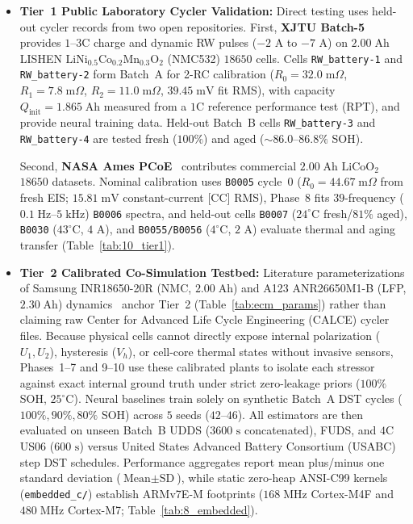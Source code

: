 \documentclass[10pt,a4paper]{article}
\begin{document}
\begin{itemize}
\item \textbf{Tier~1 Public Laboratory Cycler Validation:} Direct testing uses held-out cycler records from two open repositories. First, \textbf{XJTU Batch-5}~\cite{Wang2024xjtu} provides $1\text{--}3\text{C}$ charge and dynamic RW pulses ($-2\text{ A}$ to $-7\text{ A}$) on $2.00\;\mathrm{Ah}$ LISHEN $\text{LiNi}_{0.5}\text{Co}_{0.2}\text{Mn}_{0.3}\text{O}_2$ (NMC532) $18650$ cells. Cells \texttt{RW\_battery-1} and \texttt{RW\_battery-2} form Batch~A for 2-RC calibration ($R_0 = 32.0\;\mathrm{m}\Omega$, $R_1 = 7.8\;\mathrm{m}\Omega$, $R_2 = 11.0\;\mathrm{m}\Omega$, $39.45\;\mathrm{mV}$ fit RMS), with capacity $Q_{\text{init}} = 1.865\;\mathrm{Ah}$ measured from a $1\text{C}$ reference performance test (RPT), and provide neural training data. Held-out Batch~B cells \texttt{RW\_battery-3} and \texttt{RW\_battery-4} are tested fresh ($100\%$) and aged ($\sim 86.0\text{--}86.8\%$ SOH).

Second, \textbf{NASA Ames PCoE}~\cite{Saha2007nasa} contributes commercial $2.00\;\mathrm{Ah}$ $\text{LiCoO}_2$ $18650$ datasets. Nominal calibration uses \texttt{B0005} cycle~0 ($R_0 = 44.67\;\mathrm{m}\Omega$ from fresh EIS; $15.81\;\mathrm{mV}$ constant-current [CC] RMS), Phase~8 fits $39$-frequency ($0.1\;\mathrm{Hz}\text{--}5\;\mathrm{kHz}$) \texttt{B0006} spectra, and held-out cells \texttt{B0007} ($24^\circ\text{C}$ fresh/$81\%$ aged), \texttt{B0030} ($43^\circ\text{C}$, $4\text{ A}$), and \texttt{B0055/B0056} ($4^\circ\text{C}$, $2\text{ A}$) evaluate thermal and aging transfer (Table~\ref{tab:10_tier1}).
\item \textbf{Tier~2 Calibrated Co-Simulation Testbed:} Literature parameterizations of Samsung INR18650-20R (NMC, $2.00\;\mathrm{Ah}$) and A123 ANR26650M1-B (LFP, $2.30\;\mathrm{Ah}$) dynamics~\cite{He2011ecm,Hu2012ecm,Birkl2017diagnostics,Pecht2011calce} anchor Tier~2 (Table~\ref{tab:ecm_params}) rather than claiming raw Center for Advanced Life Cycle Engineering (CALCE) cycler files. Because physical cells cannot directly expose internal polarization ($U_1, U_2$), hysteresis ($V_h$), or cell-core thermal states without invasive sensors, Phases~1--7 and 9--10 use these calibrated plants to isolate each stressor against exact internal ground truth under strict zero-leakage priors ($100\%$ SOH, $25^\circ\text{C}$). Neural baselines train solely on synthetic Batch~A DST cycles ($100\%, 90\%, 80\%$ SOH) across $5$ seeds ($42\text{--}46$). All estimators are then evaluated on unseen Batch~B UDDS ($3600\text{ s}$ concatenated), FUDS, and $4\text{C}$ US06 ($600\text{ s}$) versus United States Advanced Battery Consortium (USABC) step DST schedules. Performance aggregates report mean plus/minus one standard deviation ($\text{Mean}\pm\text{SD}$), while static zero-heap ANSI-C99 kernels (\texttt{embedded\_c/}) establish ARMv7E-M footprints ($168\;\mathrm{MHz}$ Cortex-M4F and $480\;\mathrm{MHz}$ Cortex-M7; Table~\ref{tab:8_embedded}).
\end{itemize}
\end{document}
